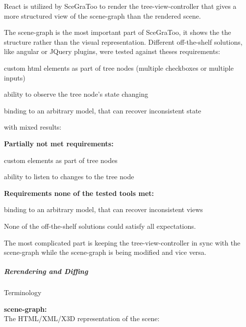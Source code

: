React is utilized by SceGraToo to render the tree-view-controller that
gives a more structured view of the scene-graph than the rendered scene.

The scene-graph is the most important part of SceGraToo, it shows the
the structure rather than the visual representation. Different
off-the-shelf solutions, like angular or JQuery plugins, were tested
against theses requirements:

\begin{enumerate*}
\def\labelenumi{\arabic{enumi}.}
\item
  custom html elements as part of tree nodes (multiple checkboxes or
  multiple inputs)
\item
  ability to observe the tree node's state changing
\item
  binding to an arbitrary model, that can recover inconsistent state
\end{enumerate*}

with mixed results:

\textbf{Partially not met requirements:}

\begin{itemize*}
\item
  custom elements as part of tree nodes
\item
  ability to listen to changes to the tree node
\end{itemize*}

\textbf{Requirements none of the tested tools met:}

\begin{itemize*}
\item
  binding to an arbitrary model, that can recover inconsistent views
\end{itemize*}

None of the off-the-shelf solutions could satisfy all expectations.

The most complicated part is keeping the tree-view-controller in sync
with the scene-graph while the scene-graph is being modified and vice
versa.

\subparagraph{Rerendering and Diffing}\label{rerendering-and-diffing}

Terminology

\textbf{scene-graph:}\\
The HTML/XML/X3D representation of the scene:


